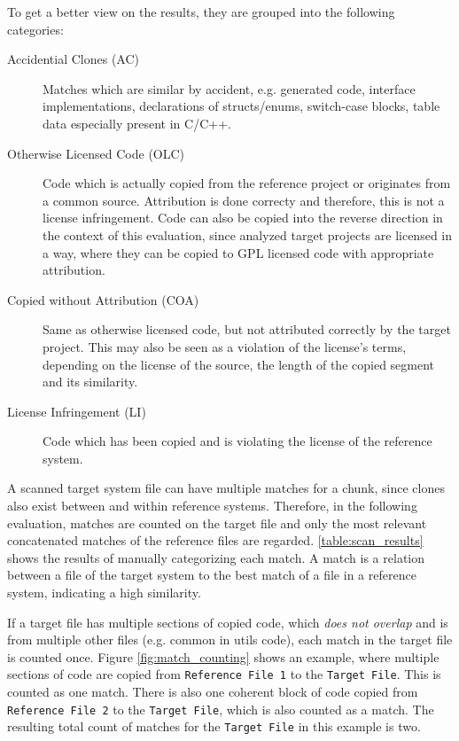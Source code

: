 To get a better view on the results, they are grouped into the following categories:
\begin{description}
	\item [Accidential Clones (AC)]
		Matches which are similar by \glqq accident\grqq, e.g. generated code, interface implementations, declarations of structs/enums, switch-case blocks, table data especially present in C/C++.
	\item[Otherwise Licensed Code (OLC)]
		Code which is actually copied from the reference project or originates from a common source.
		Attribution is done correcty and therefore, this is not a license infringement.
		Code can also be copied into the reverse direction in the context of this evaluation, since analyzed target projects are licensed in a way, where they can be copied to GPL licensed code with appropriate attribution.
	\item[Copied without Attribution (COA)] 
		Same as otherwise licensed code, but not attributed correctly by the target project.
		This may also be seen as a violation of the license's terms, depending on the license of the source, the length of the copied segment and its similarity.
	\item[License Infringement (LI)]
		Code which has been copied and is violating the license of the reference system.
\end{description}

A scanned target system file can have multiple matches for a chunk, since clones also exist between and within reference systems.
Therefore, in the following evaluation, matches are counted on the target file and only the most relevant concatenated matches of the reference files are regarded.
\autoref{table:scan_results} shows the results of manually categorizing each match.
A match is a relation between a file of the target system to the best match of a file in a reference system, indicating a high similarity.

If a target file has multiple sections of copied code, which \textit{does not overlap} and is from multiple other files (e.g. common in utils code), each match in the target file is counted once.
Figure \ref{fig:match_counting} shows an example, where multiple sections of code are copied from \texttt{Reference File 1} to the \texttt{Target File}.
This is counted as one match.
There is also one coherent block of code copied from \texttt{Reference File 2} to the \texttt{Target File}, which is also counted as a match.
The resulting total count of matches for the \texttt{Target File} in this example is two.

